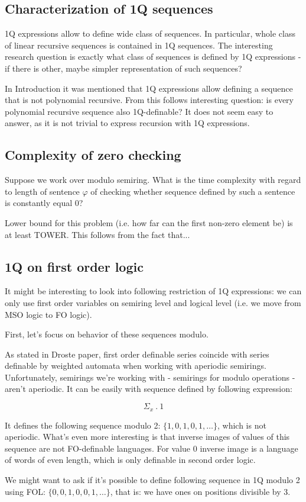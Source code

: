 \documentclass[12pt]{article}
\theoremstyle{definition}
\begin{document}
\subsection*{Characterization of 1Q sequences}
1Q expressions allow to define wide class of sequences. In particular, whole class of linear recursive sequences is contained in 1Q sequences. The interesting research question is exactly what class of sequences is defined by 1Q expressions - if there is other, maybe simpler representation of such sequences?

In Introduction it was mentioned that 1Q expressions allow defining a sequence that is not polynomial recursive. From this follows interesting question: is every polynomial recursive sequence also 1Q-definable? It does not seem easy to answer, as it is not trivial to express recursion with 1Q expressions.

\subsection*{Complexity of zero checking}
Suppose we work over modulo semiring. What is the time complexity with regard to length of sentence $\varphi$ of checking whether sequence defined by such a sentence is constantly equal $0$? 

Lower bound for this problem (i.e. how far can the first non-zero element be) is at least TOWER. This follows from the fact that...

\subsection*{1Q on first order logic}
It might be interesting to look into following restriction of 1Q expressions: we can only use first order variables on semiring level and logical level (i.e. we move from MSO logic to FO logic). 

First, let's focus on behavior of these sequences modulo.

As stated in Droste paper, first order definable series coincide with series definable by weighted automata when working with aperiodic semirings. Unfortunately, semirings we're working with - semirings for modulo operations - aren't aperiodic. It can be easily with sequence defined by following expression:

$$ \Sigma_x \ . \ 1 $$

It defines the following sequence modulo 2: $\{1, 0, 1, 0, 1, \ldots\}$, which is not aperiodic. What's even more interesting is that inverse images of values of this sequence are not FO-definable languages. For value $0$ inverse image is a language of words of even length, which is only definable in second order logic. 

We might want to ask if it's possible to define following sequence in 1Q modulo 2 using FOL: $\{0, 0, 1, 0, 0, 1, \ldots\}$, that is: we have ones on positions divisible by 3. 



\end{document}
